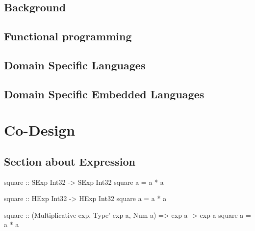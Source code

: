 \section{Background}

\lipsum[1]

\section{Functional programming}

\lipsum[2]

\section{Domain Specific Languages}

\lipsum[3]

\section{Domain Specific Embedded Languages}

\lipsum[4]

%
%

\chapter{Co-Design}

\lipsum[5]

\section{Section about Expression}

\lipsum[1]

\begin{code}
square :: SExp Int32 -> SExp Int32
square a = a * a
\end{code}

\lipsum[1]

\begin{stub}
square :: HExp Int32 -> HExp Int32
square a = a * a
\end{stub}

\lipsum[1]

\begin{stub}
square :: (Multiplicative exp, Type' exp a, Num a) => exp a -> exp a
square a = a * a
\end{stub}

